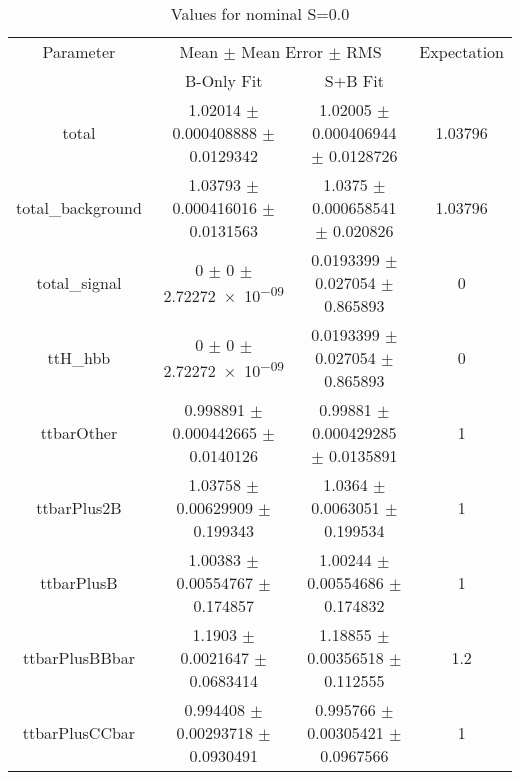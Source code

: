 \begin{table}
\centering
\caption{Values for nominal S=0.0}
\begin{tabular}{cccc}
\toprule
Parameter & \multicolumn{2}{c}{Mean $\pm$ Mean Error $\pm$ RMS} & Expectation\\
 & B-Only Fit & S+B Fit & \\
\midrule
total & \num{1.02014} $\pm$ \num{0.000408888} $\pm$ \num{0.0129342} & \num{1.02005} $\pm$ \num{0.000406944} $\pm$ \num{0.0128726} & \num{1.03796}\\
total\_background & \num{1.03793} $\pm$ \num{0.000416016} $\pm$ \num{0.0131563} & \num{1.0375} $\pm$ \num{0.000658541} $\pm$ \num{0.020826} & \num{1.03796}\\
total\_signal & \num{0} $\pm$ \num{0} $\pm$ \num{2.72272e-09} & \num{0.0193399} $\pm$ \num{0.027054} $\pm$ \num{0.865893} & \num{0}\\
ttH\_hbb & \num{0} $\pm$ \num{0} $\pm$ \num{2.72272e-09} & \num{0.0193399} $\pm$ \num{0.027054} $\pm$ \num{0.865893} & \num{0}\\
ttbarOther & \num{0.998891} $\pm$ \num{0.000442665} $\pm$ \num{0.0140126} & \num{0.99881} $\pm$ \num{0.000429285} $\pm$ \num{0.0135891} & \num{1}\\
ttbarPlus2B & \num{1.03758} $\pm$ \num{0.00629909} $\pm$ \num{0.199343} & \num{1.0364} $\pm$ \num{0.0063051} $\pm$ \num{0.199534} & \num{1}\\
ttbarPlusB & \num{1.00383} $\pm$ \num{0.00554767} $\pm$ \num{0.174857} & \num{1.00244} $\pm$ \num{0.00554686} $\pm$ \num{0.174832} & \num{1}\\
ttbarPlusBBbar & \num{1.1903} $\pm$ \num{0.0021647} $\pm$ \num{0.0683414} & \num{1.18855} $\pm$ \num{0.00356518} $\pm$ \num{0.112555} & \num{1.2}\\
ttbarPlusCCbar & \num{0.994408} $\pm$ \num{0.00293718} $\pm$ \num{0.0930491} & \num{0.995766} $\pm$ \num{0.00305421} $\pm$ \num{0.0967566} & \num{1}\\
\bottomrule
\end{tabular}
\end{table}
